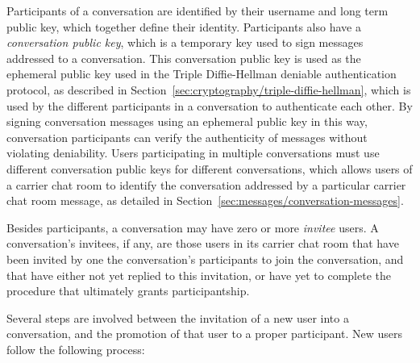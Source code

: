 \documentclass{article}
\begin{document}
Participants of a conversation are identified by their username and long term public key, which together define their identity.
Participants also have a \emph{conversation public key}, which is a temporary key used to sign messages addressed to a conversation.
This conversation public key is used as the ephemeral public key used in the Triple Diffie-Hellman deniable authentication protocol, as described in Section~\ref{sec:cryptography/triple-diffie-hellman}, which is used by the different participants in a conversation to authenticate each other.
By signing conversation messages using an ephemeral public key in this way, conversation participants can verify the authenticity of messages without violating deniability.
Users participating in multiple conversations must use different conversation public keys for different conversations, which allows users of a carrier chat room to identify the conversation addressed by a particular carrier chat room message, as detailed in Section~\ref{sec:messages/conversation-messages}.

Besides participants, a conversation may have zero or more \emph{invitee} users.
A conversation's invitees, if any, are those users in its carrier chat room that have been invited by one the conversation's participants to join the conversation, and that have either not yet replied to this invitation, or have yet to complete the procedure that ultimately grants participantship.

Several steps are involved between the invitation of a new user into a conversation, and the promotion of that user to a proper participant.
New users follow the following process:
\end{document}
